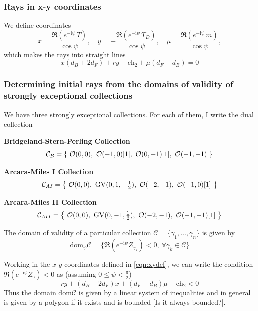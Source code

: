 \documentclass[11pt, a4paper]{article}
\newcommand{\ii}{\mathrm{i}}
\newcommand{\ch}{\mathrm{ch}}
\newcommand{\chO}{\mathcal{O}}
\newcommand{\GV}{\mathrm{GV}}
\newcommand{\remark}[1]{\textcolor{RemarkColor}{[#1]}}
\numberwithin{equation}{section}
\begin{document}
\subsubsection{Rays in x-y coordinates}

We define coordinates
\begin{equation}\label{eqn:xydef}
  x = \frac{\Re(e^{-\ii \psi} \, T)}{\cos \psi}, \quad y = -\frac{\Re(e^{-\ii \psi} \, T_D)}{\cos \psi}, \quad \mu = \frac{\Re(e^{-\ii \psi} \, m)}{\cos \psi},
\end{equation}
which makes the rays into straight lines
\begin{equation}
  x (d_B+2 d_F)+r y -\ch_2+\mu (d_F-d_B) = 0
\end{equation}

\subsubsection{Determining initial rays from the domains of validity of strongly exceptional collections}

We have three strongly exceptional collections. For each of them, I write the dual collection

\textbf{Bridgeland-Stern-Perling Collection}
\begin{equation}
  \mathcal{C}_B = \qty{ \ \chO(0, 0), \ \chO(-1, 0)[1], \ \chO(0, -1)[1], \ \chO(-1, -1) \ }
\end{equation}

\textbf{Arcara-Miles I Collection}
\begin{equation}
  \mathcal{C}_{AI} = \qty{ \ \chO(0, 0), \ \GV(0, 1, -\tfrac12), \ \chO(-2, -1), \ \chO(-1, 0)[1] \ }
\end{equation}

\textbf{Arcara-Miles II Collection}
\begin{equation}
  \mathcal{C}_{AII} = \qty{ \ \chO(0, 0), \ \GV(0, -1, \tfrac12), \ \chO(-2, -1), \ \chO(-1, -1)[1] \ }
\end{equation}

The domain of validity of a particular collection $\mathcal{C} = \{ \gamma_1, \ldots, \gamma_n \}$ is given by
\begin{equation}
  \mathrm{dom}_\psi\mathcal{C} = \{ \Re(e^{-\ii \psi} Z_{\gamma_k}) < 0, \ \forall \gamma_k \in \mathcal{C} \}
\end{equation}

Working in the $x$-$y$ coordinates defined in \cref{eqn:xydef}, we can write the condition $\Re(e^{-\ii \psi} Z_{\gamma}) < 0$ as (assuming $0 \leq \psi < \frac{\pi}{2}$)
\begin{equation}
  r y + (d_B + 2 d_F) x + (d_F - d_B) \mu - \ch_2 < 0
\end{equation}
Thus the domain $\mathrm{dom} \mathcal{C}$ is given by a linear system of inequalities and in general is given by a polygon if it exists and is bounded \remark{Is it always bounded?}.
\end{document}
